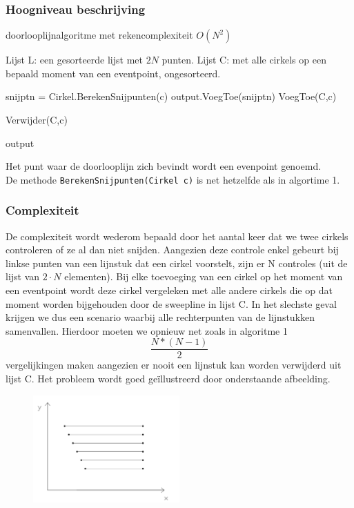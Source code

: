 \documentclass[11pt,a4paper]{article}
\begin{document}
\subsubsection{Hoogniveau beschrijving}
\begin{algorithm}[H]
\caption{doorlooplijnalgoritme met rekencomplexiteit $O(N^2)$}
\begin{algorithmic}
\State Lijst L: een gesorteerde lijst met $2N$ punten.
\State Lijst C: met alle cirkels op een bepaald moment van een eventpoint, ongesorteerd.



\State snijptn = Cirkel.BerekenSnijpunten(c)
\State output.VoegToe(snijptn)
\State VoegToe(C,c)

\Else
\State Verwijder(C,c)
\EndIf
\EndFor

\Return output
\end{algorithmic}
\end{algorithm}
Het punt waar de doorlooplijn zich bevindt wordt een evenpoint genoemd.\\
De methode \verb|BerekenSnijpunten(Cirkel c)| is net hetzelfde als in algortime 1.
\subsubsection{Complexiteit}
De complexiteit wordt wederom bepaald door het aantal keer dat we twee cirkels controleren of ze al dan niet snijden. Aangezien deze controle enkel gebeurt bij linkse punten van een lijnstuk dat een cirkel voorstelt, zijn er N controles (uit de lijst van $2\cdot N$ elementen). Bij elke toevoeging van een cirkel op het moment van een eventpoint wordt deze cirkel vergeleken met alle andere cirkels die op dat moment worden bijgehouden door de sweepline in lijst C. In het slechste geval krijgen we dus een scenario waarbij alle rechterpunten van de lijnstukken samenvallen. Hierdoor moeten we opnieuw net zoals in algoritme 1 $$\frac{N*(N-1)}{2}$$ vergelijkingen maken aangezien er nooit een lijnstuk kan worden verwijderd uit lijst C. Het probleem wordt goed geïllustreerd door onderstaande afbeelding.
\begin{figure}[H]
\centering
\includegraphics[width=0.5\textwidth]{algo2_probleem.png}
\end{figure}
\end{document}
